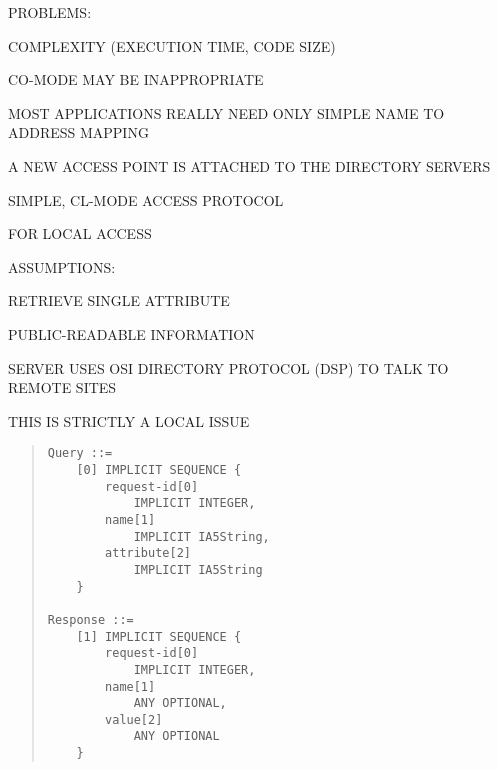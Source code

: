 \begin{bwslide}

\begin{nrtc}
\item	PROBLEMS:
    \begin{nrtc}
    \item	COMPLEXITY (EXECUTION TIME, CODE SIZE)

    \item	CO-MODE MAY BE INAPPROPRIATE
    \end{nrtc}

\item	MOST APPLICATIONS REALLY NEED ONLY SIMPLE NAME TO ADDRESS MAPPING
\end{nrtc}
\end{bwslide}


\begin{bwslide}

\begin{nrtc}
\item	A NEW ACCESS POINT IS ATTACHED TO THE DIRECTORY SERVERS
    \begin{nrtc}
    \item	SIMPLE, CL-MODE ACCESS PROTOCOL
    \end{nrtc}
    FOR LOCAL ACCESS

\item	ASSUMPTIONS:
    \begin{nrtc}
    \item	RETRIEVE SINGLE ATTRIBUTE

    \item	PUBLIC-READABLE INFORMATION

    \item	SERVER USES OSI DIRECTORY PROTOCOL (DSP) TO TALK TO REMOTE
		SITES
    \end{nrtc}

\item	THIS IS STRICTLY A LOCAL ISSUE
\end{nrtc}
\end{bwslide}


\begin{bwslide}

\begin{quote}\small\begin{verbatim}
Query ::=
    [0] IMPLICIT SEQUENCE {
        request-id[0]
            IMPLICIT INTEGER,
        name[1]
            IMPLICIT IA5String,
        attribute[2]
            IMPLICIT IA5String
    }

Response ::=
    [1] IMPLICIT SEQUENCE {
        request-id[0]
            IMPLICIT INTEGER,
        name[1]
            ANY OPTIONAL,
        value[2]
            ANY OPTIONAL
    }
\end{verbatim}\end{quote}
\end{bwslide}


